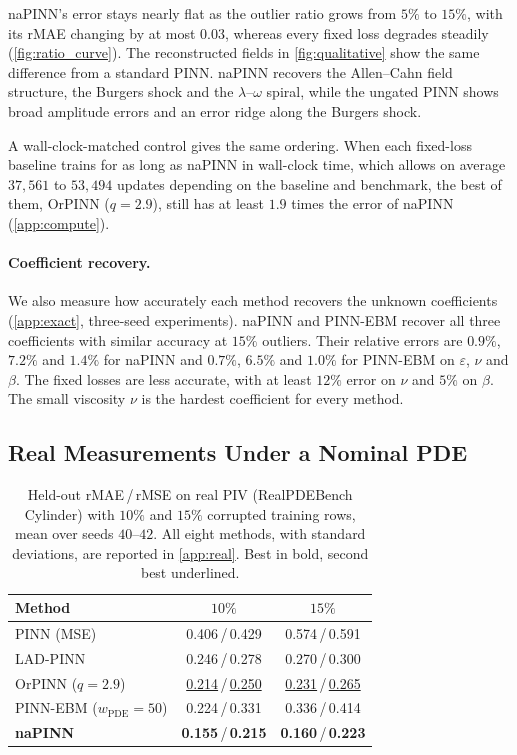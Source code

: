 \documentclass[twoside]{article}
\newcommand{\wpde}{w_{\mathrm{PDE}}}
\begin{document}
naPINN's error stays nearly flat as the outlier ratio grows from $5\%$ to $15\%$,
with its rMAE changing by at most $0.03$, whereas every fixed loss degrades steadily (\cref{fig:ratio_curve}). The reconstructed
fields in \cref{fig:qualitative} show the same difference from a standard PINN.
naPINN recovers the Allen--Cahn field structure, the Burgers shock and the
$\lambda$--$\omega$ spiral, while the ungated PINN shows broad amplitude errors
and an error ridge along the Burgers shock.

A wall-clock-matched control gives the same ordering. When each fixed-loss
baseline trains for as long as naPINN in wall-clock time, which allows on
average $37{,}561$ to $53{,}494$ updates depending on the baseline and
benchmark, the best of them, OrPINN ($q = 2.9$), still has at least $1.9$ times
the error of naPINN (\cref{app:compute}).

\paragraph{Coefficient recovery.}
We also measure how accurately each method recovers the unknown coefficients
(\cref{app:exact}, three-seed experiments). naPINN and PINN-EBM recover all
three coefficients with similar accuracy at $15\%$ outliers. Their relative
errors are $0.9\%$, $7.2\%$ and $1.4\%$ for naPINN and $0.7\%$, $6.5\%$ and
$1.0\%$ for PINN-EBM on $\varepsilon$, $\nu$ and $\beta$. The fixed losses are less accurate, with
at least $12\%$ error on $\nu$ and $5\%$ on $\beta$. The small viscosity $\nu$
is the hardest coefficient for every method.

\subsection{Real Measurements Under a Nominal PDE}
\label{sec:real}

\begin{table}[t]
\centering
\caption{Held-out rMAE\,/\,rMSE on real PIV (RealPDEBench Cylinder) with $10\%$
and $15\%$ corrupted training rows, mean over seeds $40$--$42$. All eight
methods, with standard deviations, are reported in \cref{app:real}. Best in
bold, second best underlined.}
\label{tab:piv}
\vspace{4pt}
\small
\setlength{\tabcolsep}{3pt}
\begin{tabular}{lcc}
\toprule
Method & $10\%$ & $15\%$ \\
\midrule
PINN (MSE)                 & 0.406\,/\,0.429 & 0.574\,/\,0.591 \\
LAD-PINN                   & 0.246\,/\,0.278 & 0.270\,/\,0.300 \\
OrPINN ($q = 2.9$)           & \underline{0.214}\,/\,\underline{0.250} & \underline{0.231}\,/\,\underline{0.265} \\
PINN-EBM ($\wpde = 50$)   & 0.224\,/\,0.331 & 0.336\,/\,0.414 \\
\textbf{naPINN}            & \textbf{0.155}\,/\,\textbf{0.215} & \textbf{0.160}\,/\,\textbf{0.223} \\
\bottomrule
\end{tabular}
\vspace{-14pt}
\end{table}
\end{document}
